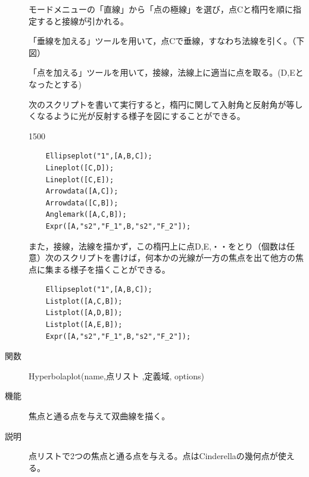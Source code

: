 \documentclass[papersize,a4paper,12pt,uplatex]{jsarticle}
\begin{document}
\begin{description}
モードメニューの「直線」から「点の極線」を選び，点Cと楕円を順に指定すると接線が引かれる。

「垂線を加える」ツールを用いて，点Cで垂線，すなわち法線を引く。（下図）

「点を加える」ツールを用いて，接線，法線上に適当に点を取る。(D,Eとなったとする)

次のスクリプトを書いて実行すると，楕円に関して入射角と反射角が等しくなるように光が反射する様子を図にすることができる。

\vspace{\baselineskip}
\begin{layer}{150}{0}
\end{layer}
\hspace{50mm}

\begin{verbatim}
    Ellipseplot("1",[A,B,C]);
    Lineplot([C,D]);
    Lineplot([C,E]);
    Arrowdata([A,C]);
    Arrowdata([C,B]);
    Anglemark([A,C,B]);
    Expr([A,"s2","F_1",B,"s2","F_2"]);
\end{verbatim}
\vspace{\baselineskip}
    \begin{center} \end{center}

  また，接線，法線を描かず，この楕円上に点D,E,・・をとり（個数は任意）次のスクリプトを書けば，何本かの光線が一方の焦点を出て他方の焦点に集まる様子を描くことができる。
\begin{verbatim}
    Ellipseplot("1",[A,B,C]);
    Listplot([A,C,B]);
    Listplot([A,D,B]);
    Listplot([A,E,B]);
    Expr([A,"s2","F_1",B,"s2","F_2"]);
\end{verbatim}

    \begin{center}\scalebox{0.9}{ }\end{center}

\hypertarget{hyperbolaplot}{}
\item[関数]  Hyperbolaplot(name,点リスト ,定義域, options)
\item[機能]  焦点と通る点を与えて双曲線を描く。
\item[説明]  点リストで2つの焦点と通る点を与える。点はCinderellaの幾何点が使える。


\end{description}
\end{document}
